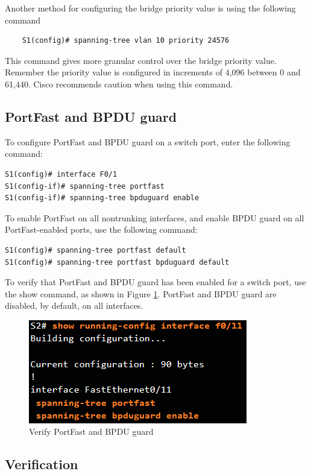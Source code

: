 Another method for configuring the bridge priority value is using the following command
    \begin{verbatim}
    S1(config)# spanning-tree vlan 10 priority 24576
    \end{verbatim}
This command gives more granular control over the bridge priority value. Remember the priority value is configured in increments of 4,096 between 0 and 61,440. Cisco recommends caution when using this command.   

\subsection{PortFast and BPDU guard} 

To configure PortFast and BPDU guard on a switch port, enter the following command:

\begin{verbatim}
S1(config)# interface F0/1
S1(config-if)# spanning-tree portfast
S1(config-if)# spanning-tree bpduguard enable
\end{verbatim}

To enable PortFast on all nontrunking interfaces, and enable BPDU guard on all PortFast-enabled ports, use the following command:

\begin{verbatim}
S1(config)# spanning-tree portfast default
S1(config)# spanning-tree portfast bpduguard default
\end{verbatim}

To verify that PortFast and BPDU guard has been enabled for a switch port, use the show command, as shown in Figure \ref{VerifyPortFast}. \note PortFast and BPDU guard are disabled, by default, on all interfaces.

\begin{figure}[hbtp]
\caption{Verify PortFast and BPDU guard}\label{VerifyPortFast}
\centering
\includegraphics[scale=0.8]{pictures/VerifyPortFast.PNG}
\end{figure}

\subsection{Verification}

